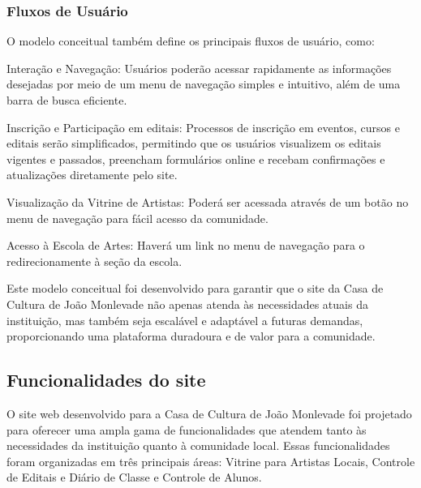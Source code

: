 \subsubsection{Fluxos de Usuário}

O modelo conceitual também define os principais fluxos de usuário, como:

Interação e Navegação: Usuários poderão acessar rapidamente as informações desejadas por meio de um menu de navegação simples e intuitivo, além de uma barra de busca eficiente.

Inscrição e Participação em editais: Processos de inscrição em eventos, cursos e editais serão simplificados, permitindo que os usuários visualizem os editais vigentes e passados, preencham formulários online e recebam confirmações e atualizações diretamente pelo site.

Visualização da Vitrine de Artistas: Poderá ser acessada através de um botão no menu de navegação para fácil acesso da comunidade.

Acesso à Escola de Artes: Haverá um link no menu de navegação para o redirecionamente à seção da escola.

Este modelo conceitual foi desenvolvido para garantir que o site da Casa de Cultura de João Monlevade não apenas atenda às necessidades atuais da instituição, mas também seja escalável e adaptável a futuras demandas, proporcionando uma plataforma duradoura e de valor para a comunidade.

\subsection{Funcionalidades do site}

O site web desenvolvido para a Casa de Cultura de João Monlevade foi projetado para oferecer uma ampla gama de funcionalidades que atendem tanto às necessidades da instituição quanto à comunidade local. Essas funcionalidades foram organizadas em três principais áreas: Vitrine para Artistas Locais, Controle de Editais e Diário de Classe e Controle de Alunos.

